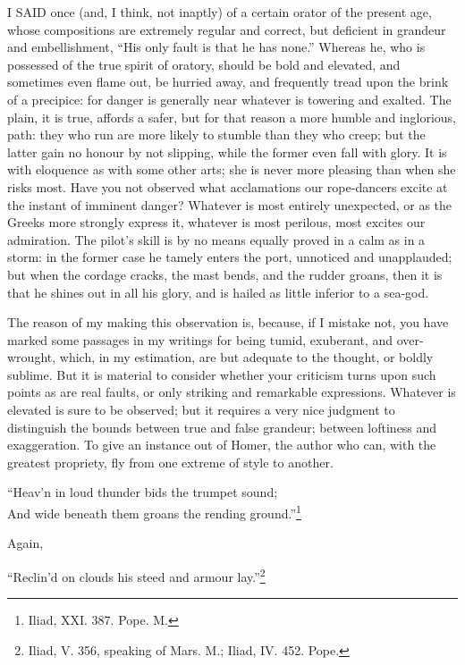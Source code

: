 
I SAID once (and, I think, not inaptly) of a certain orator of the present
age, whose compositions are extremely regular and correct, but deficient
in grandeur and embellishment, ``His only fault is that he has none.''
Whereas he, who is possessed of the true spirit of oratory, should be bold
and elevated, and sometimes even flame out, be hurried away, and
frequently tread upon the brink of a precipice: for danger is generally
near whatever is towering and exalted. The plain, it is true, affords a
safer, but for that reason a more humble and inglorious, path: they who
run are more likely to stumble than they who creep; but the latter gain no
honour by not slipping, while the former even fall with glory. It is with
eloquence as with some other arts; she is never more pleasing than when
she risks most. Have you not observed what acclamations our rope-dancers
excite at the instant of imminent danger? Whatever is most entirely
unexpected, or as the Greeks more strongly express it, whatever is most
perilous, most excites our admiration. The pilot's skill is by no means
equally proved in a calm as in a storm: in the former case he tamely
enters the port, unnoticed and unapplauded; but when the cordage cracks,
the mast bends, and the rudder groans, then it is that he shines out in
all his glory, and is hailed as little inferior to a sea-god.

The reason of my making this observation is, because, if I mistake not,
you have marked some passages in my writings for being tumid, exuberant,
and over-wrought, which, in my estimation, are but adequate to the
thought, or boldly sublime. But it is material to consider whether your
criticism turns upon such points as are real faults, or only striking and
remarkable expressions. Whatever is elevated is sure to be observed; but
it requires a very nice judgment to distinguish the bounds between true
and false grandeur; between loftiness and exaggeration. To give an
instance out of Homer, the author who can, with the greatest propriety,
fly from one extreme of style to another.

``Heav'n in loud thunder bids the trumpet sound;\\
And wide beneath them groans the rending ground.''\footnote{Iliad, XXI. 387. Pope.
M.}

Again,

``Reclin'd on clouds his steed and armour lay.''\footnote{Iliad, V. 356, speaking
of Mars. M.; Iliad, IV. 452. Pope.}

